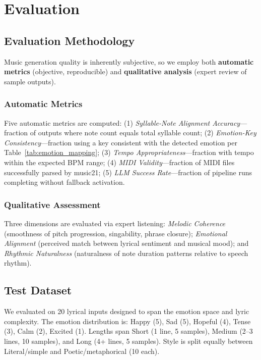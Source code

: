 \documentclass[conference]{IEEEtran}
\begin{document}
\section{Evaluation}

\subsection{Evaluation Methodology}

Music generation quality is inherently subjective, so we employ both
\textbf{automatic metrics} (objective, reproducible) and \textbf{qualitative
analysis} (expert review of sample outputs).

\subsubsection{Automatic Metrics}
Five automatic metrics are computed: (1) \textit{Syllable-Note Alignment
Accuracy}---fraction of outputs where note count equals total syllable count;
(2) \textit{Emotion-Key Consistency}---fraction using a key consistent with the
detected emotion per Table~\ref{tab:emotion_mapping}; (3) \textit{Tempo
Appropriateness}---fraction with tempo within the expected BPM range; (4)
\textit{MIDI Validity}---fraction of MIDI files successfully parsed by music21;
(5) \textit{LLM Success Rate}---fraction of pipeline runs completing without
fallback activation.

\subsubsection{Qualitative Assessment}
Three dimensions are evaluated via expert listening: \textit{Melodic
Coherence} (smoothness of pitch progression, singability, phrase closure);
\textit{Emotional Alignment} (perceived match between lyrical sentiment and
musical mood); and \textit{Rhythmic Naturalness} (naturalness of note duration
patterns relative to speech rhythm).

\subsection{Test Dataset}

We evaluated on 20 lyrical inputs designed to span the emotion space and lyric
complexity. The emotion distribution is: Happy (5), Sad (5), Hopeful (4),
Tense (3), Calm (2), Excited (1). Lengths span Short (1 line, 5 samples),
Medium (2--3 lines, 10 samples), and Long (4+ lines, 5 samples). Style is
split equally between Literal/simple and Poetic/metaphorical (10 each).
\end{document}
